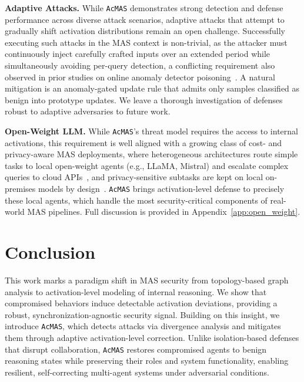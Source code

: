 \documentclass{article}
\newcommand{\app}{\texttt{AcMAS}}
\theoremstyle{plain}
\theoremstyle{definition}
\theoremstyle{remark}
\begin{document}
\noindent\textbf{Adaptive Attacks.}
While \app{} demonstrates strong detection and defense performance across diverse attack scenarios, adaptive attacks that attempt to gradually shift activation distributions remain an open challenge. Successfully executing such attacks in the MAS context is non-trivial, as the attacker must continuously inject carefully crafted inputs over an extended period while simultaneously avoiding per-query detection, a conflicting requirement also observed in prior studies on online anomaly detector poisoning~\cite{kravchik2022practical, korycki2023adversarial}. A natural mitigation is an anomaly-gated update rule that admits only samples classified as benign into prototype updates. We leave a thorough investigation of defenses robust to adaptive adversaries to future work.

\noindent\textbf{Open-Weight LLM.}
While \app{}'s threat model requires the access to internal activations, this requirement is well aligned with a growing class of cost- and privacy-aware MAS deployments, where heterogeneous architectures route simple tasks to local open-weight agents (e.g., LLaMA, Mistral) and escalate complex queries to cloud APIs~\cite{chen2023frugalgpt, ong2024routellm}, and privacy-sensitive subtasks are kept on local on-premises models by design~\cite{huang2025middle}. \app{} brings activation-level defense to precisely these local agents, which handle the most security-critical components of real-world MAS pipelines. Full discussion is provided in Appendix~\ref{app:open_weight}.

\color{black}

\section{Conclusion}
This work marks a paradigm shift in MAS security from topology-based graph analysis to activation-level modeling of internal reasoning. We show that compromised behaviors induce detectable activation deviations, providing a robust, synchronization-agnostic security signal. Building on this insight, we introduce \app{}, which detects attacks via divergence analysis and mitigates them through adaptive activation-level correction. Unlike isolation-based defenses that disrupt collaboration, \app{} restores compromised agents to benign reasoning states while preserving their roles and system functionality, enabling resilient, self-correcting multi-agent systems under adversarial conditions.
\end{document}
